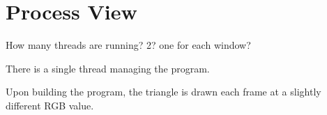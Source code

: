 \section{Process View}

How many threads are running? 2? one for each window?

There is a single thread managing the program.


Upon building the program, the triangle is drawn each frame at a slightly different RGB value.

